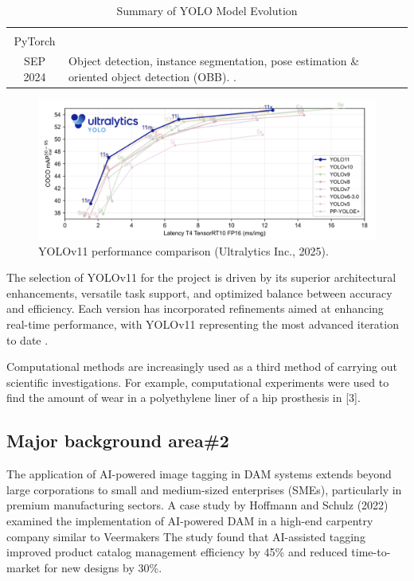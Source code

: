 \documentclass[a4paper,10pt,twocolumn]{article}
\numberwithin{figure}{section}
\numberwithin{table}{section}
\begin{document}
\begin{table}[t]
{\begin{tabularx}{\linewidth}{|c|X|}
        \begin{tabular}[t]{@{}c@{}}
            \textbf{V11}\\
            {\scriptsize PyTorch}\\
            {\tiny SEP 2024}
        \end{tabular}
        &
        Object detection, instance segmentation, pose estimation \& oriented object detection (OBB).
        \citep{UltralyticsYOLO11}.
        \\
        \hline

    \end{tabularx}
    }
    \caption{Summary of YOLO Model Evolution}
    \label{tab:yolo_versions}
\end{table}


\begin{figure}[h]
    \centering
    \includegraphics[width=1\linewidth]{YOLOV11.png}  %
    \caption{YOLOv11 performance comparison (Ultralytics Inc., 2025).}
    \label{fig:bench}  
\end{figure}

The selection of YOLOv11 for the project is driven by its superior architectural 
enhancements, versatile task support, and optimized balance between accuracy and 
efficiency. 
  Each version has incorporated refinements aimed at enhancing real-time performance, 
  with YOLOv11 representing the most advanced iteration to date \citep{khanam2024yolov11overviewkeyarchitectural}.
\vspace{0.3cm}

Computational methods are increasingly used as a third method of carrying out scientific
investigations. For example, computational experiments were used to find the amount of wear in a
polyethylene liner of a hip prosthesis in [3].

\subsection{Major background area\#2}
The application of AI-powered image tagging in DAM systems extends beyond large corporations 
to small and medium-sized enterprises (SMEs), particularly in premium manufacturing sectors. A case study 
by Hoffmann and Schulz (2022) examined the implementation of AI-powered DAM in a high-end carpentry 
company similar to Veermakers
The study found that AI-assisted tagging improved product catalog management 
efficiency by 45\% and reduced time-to-market for new designs by 30\%.
\end{document}
